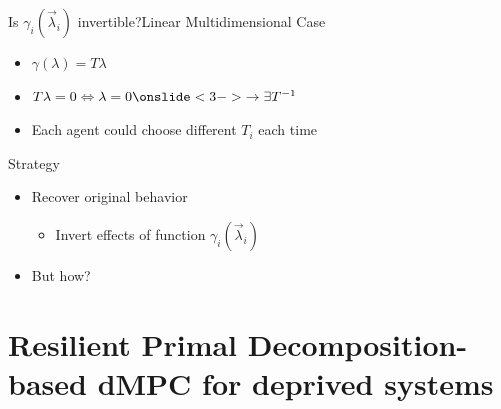 \documentclass[aspectratio=169]{beamer}
\begin{document}
\begin{frame}{Is $\gamma_{i}(\vec{\lambda}_{i})$ invertible?}{Linear Multidimensional Case}
  \centering
  \begin{itemize}
    \item<1-> $\gamma(\lambda)=T\lambda$
    \item<2-> $T\lambda=0 \iff \lambda=0 \onslide<3->{\to \exists T^{-1}}$
    \item<4-> Each agent could choose different $T_{i}$ each time 
  \end{itemize}
\end{frame}


\begin{frame}{Strategy}
  \begin{itemize}
    \item Recover original behavior
          \begin{itemize}
            \item Invert effects of function $\gamma_{i}(\vec{\lambda}_{i})$ 
          \end{itemize}
    \item<3-> But how? 
  \end{itemize}
\end{frame}

\section{Resilient Primal Decomposition-based dMPC for deprived systems}
\end{document}
